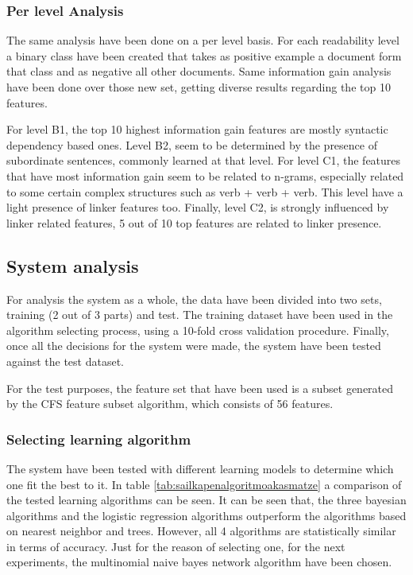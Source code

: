 \documentclass{acm_proc_article-sp}
\begin{document}
\subsubsection{Per level Analysis}
The same analysis have been done on a per level basis. For each readability level a binary class have been created that takes as positive example a document form that class and as negative all other documents. Same information gain analysis have been done over those new set, getting diverse results regarding the top 10 features.


For level B1, the top 10 highest information gain features are mostly syntactic dependency based ones. Level B2, seem to be determined by the presence of subordinate sentences, commonly learned at that level. For level C1, the features that have most information gain seem to be related to n-grams, especially related to some certain complex structures such as verb + verb + verb. This level have a light presence of linker features too. Finally, level C2, is strongly influenced by linker related features, 5 out of 10 top features are related to linker presence.

\subsection{System analysis}
For analysis the system as a whole, the data have been divided into two sets, training (2 out of 3 parts) and test. The training dataset have been used in the algorithm selecting process, using a 10-fold cross validation procedure. Finally, once all the decisions for the system were made, the system have been tested against the test dataset. 

For the test purposes, the feature set that have been used is a subset generated by the CFS feature subset algorithm, which consists of 56 features.

\subsubsection{Selecting learning algorithm}
The system have been tested with different learning models to determine which one fit the best to it. In table \ref{tab:sailkapenalgoritmoakasmatze} a comparison of the tested learning algorithms can be seen. It can be seen that, the three bayesian algorithms and the logistic regression algorithms outperform the algorithms based on nearest neighbor and trees. However, all 4 algorithms are statistically similar in terms of accuracy. Just for the reason of selecting one, for the next experiments, the multinomial naive bayes network algorithm have been chosen. 
\end{document}
